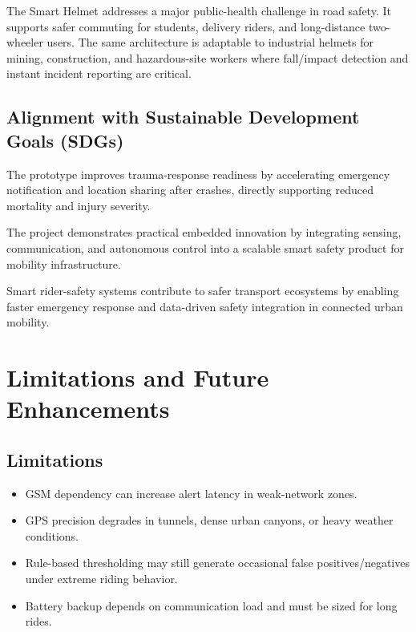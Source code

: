 \documentclass[10pt,a4paper]{article}
\begin{document}
The Smart Helmet addresses a major public-health challenge in road safety. It supports safer commuting for students, delivery riders, and long-distance two-wheeler users. The same architecture is adaptable to industrial helmets for mining, construction, and hazardous-site workers where fall/impact detection and instant incident reporting are critical.

\subsection{Alignment with Sustainable Development Goals (SDGs)}

\begin{description}[leftmargin=1.5em]

  \item[\textbf{SDG 3 -- Good Health and Well-Being:}]
  The prototype improves trauma-response readiness by accelerating emergency notification and location sharing after crashes, directly supporting reduced mortality and injury severity.

  \item[\textbf{SDG 9 -- Industry, Innovation and Infrastructure:}]
  The project demonstrates practical embedded innovation by integrating sensing, communication, and autonomous control into a scalable smart safety product for mobility infrastructure.

  \item[\textbf{SDG 11 -- Sustainable Cities and Communities:}]
  Smart rider-safety systems contribute to safer transport ecosystems by enabling faster emergency response and data-driven safety integration in connected urban mobility.

\end{description}

\section{Limitations and Future Enhancements}

\subsection*{Limitations}
\begin{itemize}[leftmargin=1.5em]
  \item GSM dependency can increase alert latency in weak-network zones.
  \item GPS precision degrades in tunnels, dense urban canyons, or heavy weather conditions.
  \item Rule-based thresholding may still generate occasional false positives/negatives under extreme riding behavior.
  \item Battery backup depends on communication load and must be sized for long rides.
\end{itemize}
\end{document}
